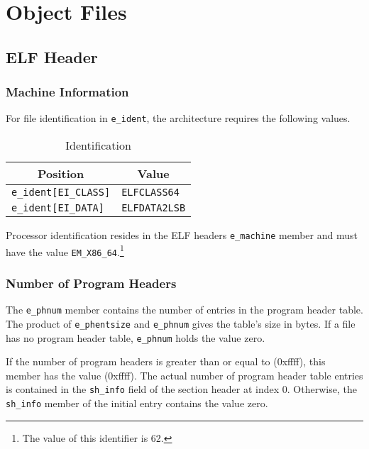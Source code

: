 
\chapter{Object Files}

\section{ELF Header}

\subsection{Machine Information}

For file identification in \texttt{e_ident}, the \xARCH architecture
requires the following values.

\begin{table}[H]
\Hrule
  \caption{\xARCH Identification}
  \begin{center}
    \begin{tabular}[t]{l|l}
      \multicolumn{1}{c}{Position} & \multicolumn{1}{c}{Value} \\
      \hline
      \texttt{e_ident[EI_CLASS]} & \texttt{ELFCLASS64} \\
      \texttt{e_ident[EI_DATA]} & \texttt{ELFDATA2LSB}
    \end{tabular}
  \end{center}
\Hrule
\end{table}

Processor identification resides in the ELF headers
\texttt{e_machine} member and must have the value
\texttt{EM_X86_64}.\footnote{The value of this identifier is 62.}

\subsection{Number of Program Headers}

The \texttt{e_phnum} member contains the number of entries in the program
header table. The product of
\texttt{e_phentsize} and \texttt{e_phnum} gives the table's size in bytes.
If a file has no program header table, \texttt{e_phnum} holds the value zero.

If the number of program headers is greater than or equal to
 (0xffff), this member has the value  (0xffff).
The actual number of program header table entries is contained in
the \texttt{sh_info} field of the section header at index 0. Otherwise,
the \texttt{sh_info} member of the initial entry contains the value zero.

